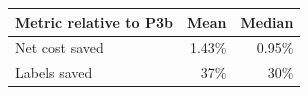 \begin{tabular}{lrr}
\toprule
Metric relative to P3b & Mean & Median \\
\midrule
Net cost saved & 1.43\% & 0.95\% \\
Labels saved & 37\% & 30\% \\
\bottomrule
\end{tabular}
